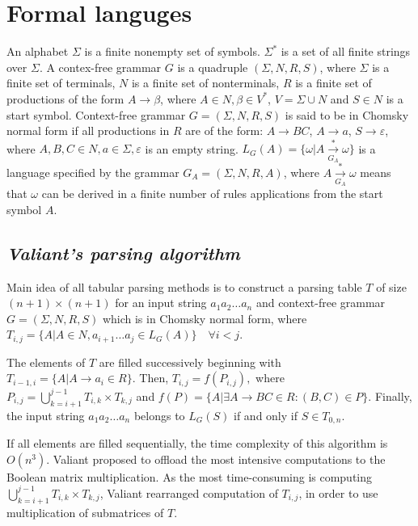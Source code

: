 \section{\bf Formal languges}

An alphabet $\Sigma$ is a finite nonempty set of symbols.
$\Sigma^{*}$ is a set of all finite strings over $\Sigma$.
A contex-free grammar $G$ is a quadruple $(\Sigma, N, R, S)$, where $\Sigma$ is a finite set of terminals, $N$ is a finite set of nonterminals, $R$ is a finite set of productions of the form $A \rightarrow \beta$, where $A \in N, \beta \in V^{*}$, $V = \Sigma \cup N$ and $S \in N$ is a start symbol.
Context-free grammar $G = (\Sigma, N, R, S)$ is said to be in Chomsky normal form if all productions in $R$ are of the form: $A \rightarrow BC$, $A \rightarrow a$, $S \rightarrow \varepsilon$, where $A, B, C \in N, a \in \Sigma, \varepsilon$ is an empty string.
$L_{G}(A) = \{ \omega | A \xrightarrow[G_A]{*} \omega\}$ is a language specified by the grammar $G_{A} = (\Sigma, N, R, A)$, where $A \xrightarrow[G_A]{*} \omega$ means that $\omega$ can be derived in a finite number of rules applications from the start symbol $A$.

\subsection{\bf \it Valiant's parsing algorithm}


Main idea of all tabular parsing methods is to construct a parsing table $T$ of size $(n + 1) \times (n + 1)$ for an input string $a_{1}a_{2} \dots a_{n}$ and context-free grammar $G = (\Sigma, N, R, S)$ which is in Chomsky normal form, where $T_{i, j} =  \{ A | A \in N, a_{i + 1} \dots a_{j} \in L_{G}(A)\} \quad \forall i < j.$

The elements of $T$ are filled successively beginning with $T_{i - 1, i} = \{ A | A \rightarrow a_{i} \in R\}.$
Then, $T_{i, j} = f(P_{i, j}),$ where
$P_{i, j} = \bigcup\limits_{k = i + 1}^{j - 1} T_{i,k} \times T_{k, j}$ and
$f(P) = \{A | \exists A \rightarrow BC \in R : (B, C) \in P\}.$
Finally, the input string $a_{1}a_{2} \dots a_{n}$ belongs to $L_{G}(S)$ if and only if $S \in T_{0, n}$.

If all elements are filled sequentially, the time complexity of this algorithm is $O(n^3)$. Valiant proposed to offload the most intensive computations to the Boolean matrix multiplication. As the most time-consuming is computing $\bigcup\limits_{k = i + 1}^{j - 1} T_{i, k} \times T_{k, j}$, Valiant rearranged computation of $T_{i, j}$, in order to use multiplication of submatrices of $T$.

